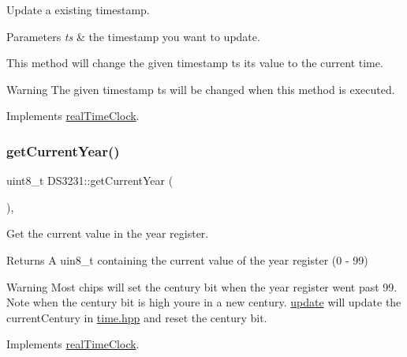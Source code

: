Update a existing timestamp. 


\begin{DoxyParams}{Parameters}
{\em ts} & the timestamp you want to update.\\
\hline
\end{DoxyParams}
This method will change the given timestamp ts its value to the current time. \begin{DoxyWarning}{Warning}
The given timestamp ts will be changed when this method is executed. 
\end{DoxyWarning}


Implements \mbox{\hyperlink{classreal_time_clock_aa7402c5941b089d4e86b2af20d48b7ba}{real\+Time\+Clock}}.

\mbox{\label{class_d_s3231_a28a340b10b045ad1e8b94532a57c3759}} 
\subsubsection{\texorpdfstring{get\+Current\+Year()}{getCurrentYear()}}
{\footnotesize\ttfamily uint8\+\_\+t D\+S3231\+::get\+Current\+Year (\begin{DoxyParamCaption}{ }\end{DoxyParamCaption})\hspace{0.3cm}{\ttfamily [override]}, {\ttfamily [virtual]}}



Get the current value in the year register. 

\begin{DoxyReturn}{Returns}
A uin8\+\_\+t containing the current value of the year register (0 -\/ 99) 
\end{DoxyReturn}
\begin{DoxyWarning}{Warning}
Most chips will set the century bit when the year register went past 99. Note when the century bit is high you\textquotesingle{}re in a new century. \mbox{\hyperlink{class_d_s3231_a143ec57122d892ea0ec671a153352f2c}{update}} will update the current\+Century in \mbox{\hyperlink{time_8hpp_source}{time.\+hpp}} and reset the century bit. 
\end{DoxyWarning}


Implements \mbox{\hyperlink{classreal_time_clock_a0cb99c34e2d6a089a62c8bea760c5add}{real\+Time\+Clock}}.

\mbox{\label{class_d_s3231_aee77c6ecb3c292d375eebe7e58ebb024}} 
